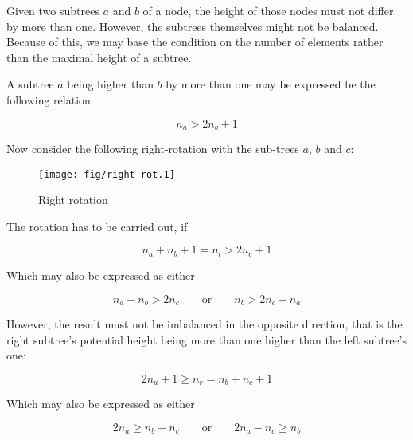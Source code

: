         Given two subtrees $a$ and $b$ of a node, the height of those nodes
        must not differ by more than one.
        However, the subtrees themselves might not be balanced.
        Because of this, we may base the condition on the number of elements
        rather than the maximal height of a subtree.

        A subtree $a$ being higher than $b$ by more than one may be expressed
        be the following relation:

        \begin{equation}
            n_a > 2n_b + 1
        \end{equation}

        Now consider the following right-rotation with the sub-trees $a$, $b$
        and $c$:

        \begin{figure}[!h]
            \caption{Right rotation}
            \label{fig:AVL_ops-rebalance-rot}
            \begin{center}
                \texttt{[image: fig/right-rot.1]}
            \end{center}
        \end{figure}

        The rotation has to be carried out, if

        \begin{equation}
            n_a + n_b + 1 = n_l > 2n_c +1
            \label{sec:AVL_ops-rebalance-rot_preq}
        \end{equation}

        Which may also be expressed as either

        \begin{equation}
            n_a + n_b > 2n_c \qquad \mathrm{or} \qquad n_b > 2n_c - n_a
        \end{equation}

        However, the result must not be imbalanced in the opposite direction,
        that is the right subtree's potential height being more than one higher
        than the left subtree's one:

        \begin{equation}
            2n_a + 1 \geq n_r = n_b + n_c + 1
            \label{sec:AVL_ops-rebalance-rot_cond1}
        \end{equation}

        Which may also be expressed as either

        \begin{equation}
            2n_a \geq n_b + n_c \qquad \mathrm{or} \qquad 2n_a - n_c \geq n_b
        \end{equation}

